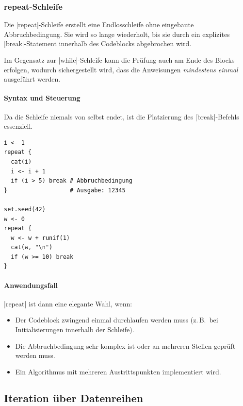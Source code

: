 \documentclass[10pt,twocolumn]{scrartcl}
\renewcommand{\lstinline}{\mycoloredinline}
\begin{document}
\subsubsection{repeat-Schleife}

Die \lstinline|repeat|-Schleife erstellt eine Endlosschleife ohne eingebaute Abbruchbedingung. Sie wird so lange wiederholt, bis sie durch ein explizites \lstinline|break|-Statement innerhalb des Codeblocks abgebrochen wird. 

Im Gegensatz zur \lstinline|while|-Schleife kann die Prüfung auch am Ende des Blocks erfolgen, wodurch sichergestellt wird, dass die Anweisungen \emph{mindestens einmal} ausgeführt werden.

\paragraph{Syntax und Steuerung}

Da die Schleife niemals von selbst endet, ist die Platzierung des \lstinline|break|-Befehls essenziell.

\begin{lstlisting}
i <- 1
repeat {
  cat(i)
  i <- i + 1
  if (i > 5) break # Abbruchbedingung
}                  # Ausgabe: 12345

set.seed(42)
w <- 0
repeat {
  w <- w + runif(1)
  cat(w, "\n")
  if (w >= 10) break
}
\end{lstlisting}

\paragraph{Anwendungsfall}

\lstinline|repeat| ist dann eine elegante Wahl, wenn:

\begin{itemize}
\item Der Codeblock zwingend einmal durchlaufen werden muss (z.\,B.\ bei Initialisierungen innerhalb der Schleife).
\item Die Abbruchbedingung sehr komplex ist oder an mehreren Stellen geprüft werden muss.
\item Ein Algorithmus mit mehreren Austrittspunkten implementiert wird.
\end{itemize}


\subsection{Iteration über Datenreihen}
\end{document}

